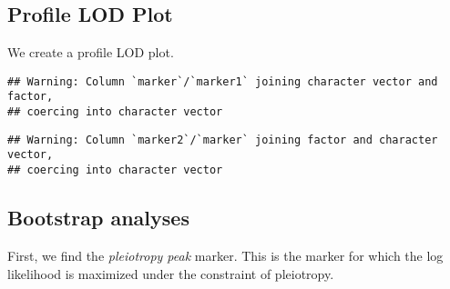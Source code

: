 \documentclass{book}
\newenvironment{Shaded}{\begin{snugshade}}{\end{snugshade}}
\newcommand{\DataTypeTok}[1]{\textcolor[rgb]{0.13,0.29,0.53}{#1}}
\newcommand{\DecValTok}[1]{\textcolor[rgb]{0.00,0.00,0.81}{#1}}
\newcommand{\KeywordTok}[1]{\textcolor[rgb]{0.13,0.29,0.53}{\textbf{#1}}}
\newcommand{\NormalTok}[1]{#1}
\newcommand{\OperatorTok}[1]{\textcolor[rgb]{0.81,0.36,0.00}{\textbf{#1}}}
\newcommand{\StringTok}[1]{\textcolor[rgb]{0.31,0.60,0.02}{#1}}
\begin{document}
\hypertarget{profile-lod-plot}{%
\subsection{Profile LOD Plot}\label{profile-lod-plot}}

We create a profile LOD plot.

\begin{Shaded}
\end{Shaded}

\begin{verbatim}
## Warning: Column `marker`/`marker1` joining character vector and factor,
## coercing into character vector
\end{verbatim}

\begin{verbatim}
## Warning: Column `marker2`/`marker` joining factor and character vector,
## coercing into character vector
\end{verbatim}

\hypertarget{bootstrap-analyses}{%
\subsection{Bootstrap analyses}\label{bootstrap-analyses}}

First, we find the \emph{pleiotropy peak} marker. This is the marker for
which the log likelihood is maximized under the constraint of
pleiotropy.
\end{document}
